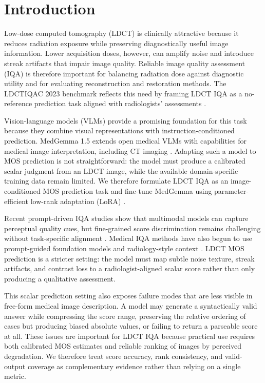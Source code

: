 \chapter{Introduction}
Low-dose computed tomography (LDCT) is clinically attractive because it reduces radiation exposure while preserving diagnostically useful image information. Lower acquisition doses, however, can amplify noise and introduce streak artifacts that impair image quality. Reliable image quality assessment (IQA) is therefore important for balancing radiation dose against diagnostic utility and for evaluating reconstruction and restoration methods. The LDCTIQAC 2023 benchmark reflects this need by framing LDCT IQA as a no-reference prediction task aligned with radiologists' assessments \cite{lee2025low}.

Vision-language models (VLMs) provide a promising foundation for this task because they combine visual representations with instruction-conditioned prediction. MedGemma 1.5 extends open medical VLMs with capabilities for medical image interpretation, including CT imaging \cite{sellergren2026medgemma}. Adapting such a model to MOS prediction is not straightforward: the model must produce a calibrated scalar judgment from an LDCT image, while the available domain-specific training data remain limited. We therefore formulate LDCT IQA as an image-conditioned MOS prediction task and fine-tune MedGemma using parameter-efficient low-rank adaptation (LoRA) \cite{hu2022lora}.

Recent prompt-driven IQA studies show that multimodal models can capture perceptual quality cues, but fine-grained score discrimination remains challenging without task-specific alignment \cite{wu2024comprehensive}. Medical IQA methods have also begun to use prompt-guided foundation models and radiology-style context \cite{xun2025mediqa,rifa2026capiqa}. LDCT MOS prediction is a stricter setting: the model must map subtle noise texture, streak artifacts, and contrast loss to a radiologist-aligned scalar score rather than only producing a qualitative assessment.

This scalar prediction setting also exposes failure modes that are less visible in free-form medical image description. A model may generate a syntactically valid answer while compressing the score range, preserving the relative ordering of cases but producing biased absolute values, or failing to return a parseable score at all. These issues are important for LDCT IQA because practical use requires both calibrated MOS estimates and reliable ranking of images by perceived degradation. We therefore treat score accuracy, rank consistency, and valid-output coverage as complementary evidence rather than relying on a single metric.

